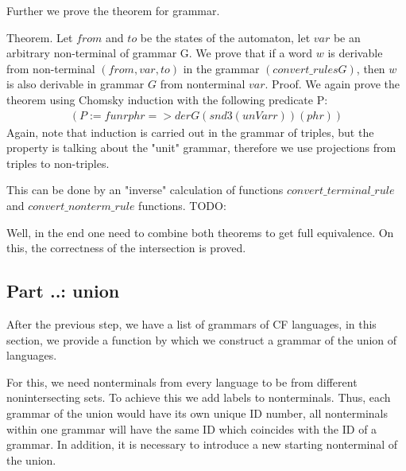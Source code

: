 Further we prove the theorem for grammar.

Theorem.
Let $from$ and $to$ be the states of the automaton, let $var$ be an arbitrary non-terminal of grammar G. We prove that if a word $w$ is derivable from non-terminal $(from, var, to)$ in the grammar $(convert\_rules G)$, then $w$ is also derivable in grammar $G$ from nonterminal $var$.
Proof.
We again prove the theorem using Chomsky induction with the following predicate P:
\begin{align*}
(P := fun r phr => der G (snd3 (unVar r)) (phr))
\end{align*}
Again, note that induction is carried out in the grammar of triples, but the property is talking about the "unit" grammar, therefore we use projections from triples to non-triples.

This can be done by an "inverse" calculation of functions $convert\_terminal\_rule$ and $convert\_nonterm\_rule$ functions.
TODO: %
 


Well, in the end one need to combine both theorems to get full equivalence. On this, the correctness of the intersection is proved.

\subsection{Part ..: union}

After the previous step, we have a list of grammars of CF languages, in this section, we provide a function by which we construct a grammar of the union of languages.

For this, we need nonterminals from every language to be from different nonintersecting sets. To achieve this we add labels to nonterminals. Thus, each grammar of the union would have its own unique ID number, all nonterminals within one grammar will have the same ID which coincides with the ID of a grammar. In addition, it is necessary to introduce a new starting nonterminal of the union.

